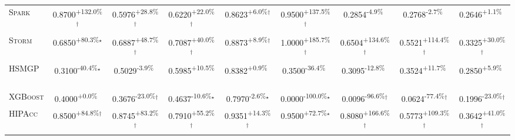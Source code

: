 \begin{table}[htbp]
\begin{tabular}{l|cccc|cccc}
\textsc{Spark} & \cellcolor{green!30}0.8700\textsuperscript{+132.0\%}$^\dagger$ & \cellcolor{green!30}0.5976\textsuperscript{+28.8\%}$^\dagger$ & \cellcolor{green!30}0.6220\textsuperscript{+22.0\%}$^\dagger$ & \cellcolor{green!30}0.8623\textsuperscript{+6.0\%}$^\dagger$ & \cellcolor{green!30}0.9500\textsuperscript{+137.5\%}$^\dagger$ & \cellcolor{red!30}0.2854\textsuperscript{-4.9\%}$^{\,\,\,}$ & \cellcolor{red!30}0.2768\textsuperscript{-2.7\%}$^{\,\,\,}$ & \cellcolor{green!30}0.2646\textsuperscript{+1.1\%}$^{\,\,\,}$ \\
\textsc{Storm} & \cellcolor{green!30}0.6850\textsuperscript{+80.3\%}$^\star$ & \cellcolor{green!30}0.6887\textsuperscript{+48.7\%}$^\dagger$ & \cellcolor{green!30}0.7087\textsuperscript{+40.0\%}$^\dagger$ & \cellcolor{green!30}0.8873\textsuperscript{+8.9\%}$^\dagger$ & \cellcolor{green!30}1.0000\textsuperscript{+185.7\%}$^\dagger$ & \cellcolor{green!30}0.6504\textsuperscript{+134.6\%}$^\dagger$ & \cellcolor{green!30}0.5521\textsuperscript{+114.4\%}$^\dagger$ & \cellcolor{green!30}0.3325\textsuperscript{+30.0\%}$^\dagger$ \\
\textsc{HSMGP} & \cellcolor{red!30}0.3100\textsuperscript{-40.4\%}$^\star$ & \cellcolor{red!30}0.5029\textsuperscript{-3.9\%}$^{\,\,\,}$ & \cellcolor{green!30}0.5985\textsuperscript{+10.5\%}$^{\,\,\,}$ & \cellcolor{green!30}0.8382\textsuperscript{+0.9\%}$^{\,\,\,}$ & \cellcolor{red!30}0.3500\textsuperscript{-36.4\%}$^{\,\,\,}$ & \cellcolor{red!30}0.3095\textsuperscript{-12.8\%}$^{\,\,\,}$ & \cellcolor{green!30}0.3524\textsuperscript{+11.7\%}$^{\,\,\,}$ & \cellcolor{green!30}0.2850\textsuperscript{+5.9\%}$^{\,\,\,}$ \\
\textsc{XGBoost} & \cellcolor{green!30}0.4000\textsuperscript{+0.0\%}$^{\,\,\,}$ & \cellcolor{red!30}0.3676\textsuperscript{-23.0\%}$^\dagger$ & \cellcolor{red!30}0.4637\textsuperscript{-10.6\%}$^\star$ & \cellcolor{red!30}0.7970\textsuperscript{-2.6\%}$^\star$ & \cellcolor{red!30}0.0000\textsuperscript{-100.0\%}$^\star$ & \cellcolor{red!30}0.0096\textsuperscript{-96.6\%}$^\dagger$ & \cellcolor{red!30}0.0624\textsuperscript{-77.4\%}$^\dagger$ & \cellcolor{red!30}0.1996\textsuperscript{-23.0\%}$^\dagger$ \\
\textsc{HIPAcc} & \cellcolor{green!30}0.8500\textsuperscript{+84.8\%}$^\dagger$ & \cellcolor{green!30}0.8745\textsuperscript{+83.2\%}$^\dagger$ & \cellcolor{green!30}0.7910\textsuperscript{+55.2\%}$^\dagger$ & \cellcolor{green!30}0.9351\textsuperscript{+14.3\%}$^\dagger$ & \cellcolor{green!30}0.9500\textsuperscript{+72.7\%}$^\star$ & \cellcolor{green!30}0.8080\textsuperscript{+166.6\%}$^\dagger$ & \cellcolor{green!30}0.5773\textsuperscript{+109.3\%}$^\dagger$ & \cellcolor{green!30}0.3642\textsuperscript{+41.0\%}$^\dagger$ \\

\end{tabular}
\end{table}
